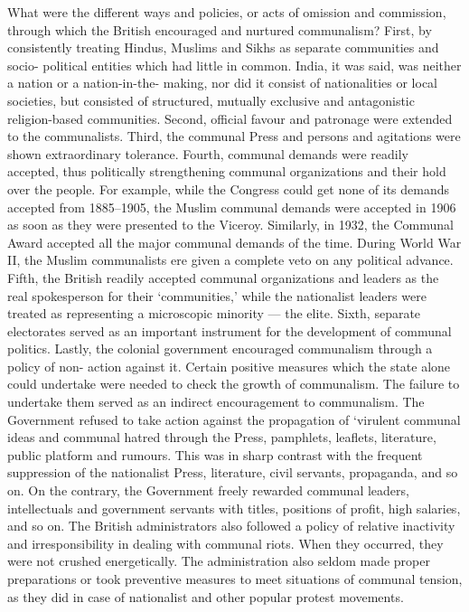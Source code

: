 \begin{multicols}{2}
What were the different ways and policies, or acts of omission and commission, through which the British encouraged and nurtured communalism? First, by consistently treating Hindus, Muslims and Sikhs as separate communities and socio- political entities which had little in common. India, it was said, was neither a nation or a nation-in-the- making, nor did it consist of nationalities or local societies, but consisted of structured, mutually exclusive and antagonistic religion-based communities. Second, official favour and patronage were extended to the communalists. Third, the communal Press and persons and agitations were shown extraordinary tolerance. Fourth, communal demands were readily accepted, thus politically strengthening communal organizations and their hold over the people. For example, while the Congress could get none of its demands accepted from 1885--1905, the Muslim communal demands were accepted in 1906 as soon as they were presented to the Viceroy. Similarly, in 1932, the Communal Award accepted all the major communal demands of the time. During World War II, the Muslim communalists ere given a complete veto on any political advance. Fifth, the British readily accepted communal organizations and leaders as the real spokesperson for their `communities,' while the nationalist leaders were treated as representing a microscopic minority --- the elite. Sixth, separate electorates served as an important instrument for the development of communal politics. Lastly, the colonial government encouraged communalism through a policy of non- action against it. Certain positive measures which the state alone could undertake were needed to check the growth of communalism. The failure to undertake them served as an indirect encouragement to communalism. The Government refused to take action against the propagation of `virulent communal ideas and communal hatred through the Press, pamphlets, leaflets, literature, public platform and rumours. This was in sharp contrast with the frequent suppression of the nationalist Press, literature, civil servants, propaganda, and so on. On the contrary, the Government freely rewarded communal leaders, intellectuals and government servants with titles, positions of profit, high salaries, and so on. The British administrators also followed a policy of relative inactivity and irresponsibility in dealing with communal riots. When they occurred, they were not crushed energetically. The administration also seldom made proper preparations or took preventive measures to meet situations of communal tension, as they did in case of nationalist and other popular protest movements. 


\end{multicols}
